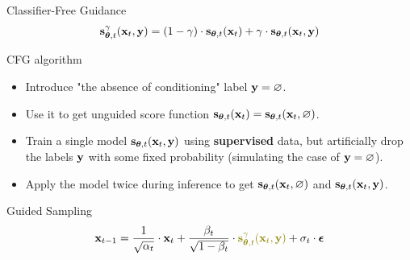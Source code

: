 \documentclass{beamer}
\begin{document}
\begin{frame}{Classifier-Free Guidance}
	\[
		\mathbf{s}^{\gamma}_{\boldsymbol{\theta}, t}(\mathbf{x}_t, \mathbf{y}) = (1 - \gamma) \cdot \mathbf{s}_{\boldsymbol{\theta}, t}(\mathbf{x}_t) +  \gamma \cdot \mathbf{s}_{\boldsymbol{\theta}, t}(\mathbf{x}_t, \mathbf{y})
	\]
	\vspace{-0.5cm}
	\begin{block}{CFG algorithm}
		\begin{itemize}
			\item Introduce "the absence of conditioning" label $\mathbf{y} = \varnothing$.		
			\eqpause
			\item Use it to get unguided score function $\mathbf{s}_{\boldsymbol{\theta}, t}(\mathbf{x}_t) = \mathbf{s}_{\boldsymbol{\theta}, t}(\mathbf{x}_t, \varnothing)$.		
			\eqpause
			\item Train a single model $\mathbf{s}_{\boldsymbol{\theta}, t}(\mathbf{x}_t, \mathbf{y})$ using \textbf{supervised} data, but artificially drop the labels $\mathbf{y}$ with some fixed probability (simulating the case of $\mathbf{y} = \varnothing$).		
			\eqpause
			\item Apply the model twice during inference to get $\mathbf{s}_{\boldsymbol{\theta}, t}(\mathbf{x}_t, \varnothing)$ and $\mathbf{s}_{\boldsymbol{\theta}, t}(\mathbf{x}_t, \mathbf{y})$.
		\end{itemize}
	\end{block}
	\vspace{-0.3cm}
	\eqpause
	\begin{block}{Guided Sampling}
		\vspace{-0.3cm}
		\[
			\bx_{t-1} = \frac{1}{\sqrt{\alpha_t}} \cdot \bx_t + \frac{\beta_t}{\sqrt{1 - \beta_t}} \cdot  {\color{olive}\bs^{\gamma}_{\btheta, t}(\bx_t, \by)} + \sigma_t \cdot \bepsilon
		\]
		\vspace{-0.3cm}
	\end{block}
\end{frame}
\end{document}
